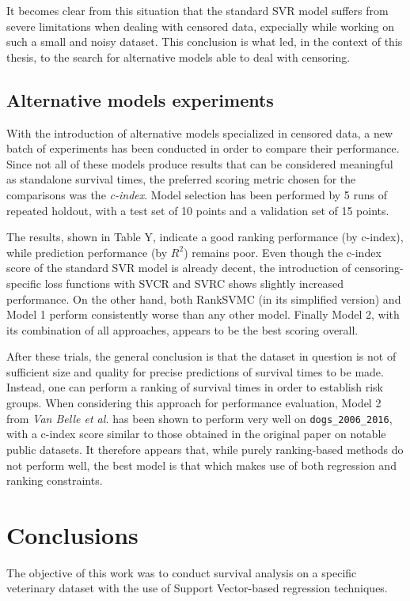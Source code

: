 \documentclass[12pt]{report}
\begin{document}
It becomes clear from this situation that the standard SVR model suffers from severe limitations when dealing with censored data, expecially while working on such a small and noisy dataset. This conclusion is what led, in the context of this thesis, to the search for alternative models able to deal with censoring.

\section{Alternative models experiments}

With the introduction of alternative models specialized in censored data, a new batch of experiments has been conducted in order to compare their performance. Since not all of these models produce results that can be considered meaningful as standalone survival times, the preferred scoring metric chosen for the comparisons was the \textit{c-index}. Model selection has been performed by 5 runs of repeated holdout, with a test set of 10 points and a validation set of 15 points.

The results, shown in Table Y, indicate a good ranking performance (by c-index), while prediction performance (by $R^2$) remains poor. Even though the c-index score of the standard SVR model is already decent, the introduction of censoring-specific loss functions with SVCR and SVRC shows slightly increased performance. On the other hand, both RankSVMC (in its simplified version) and Model 1 perform consistently worse than any other model. Finally Model 2, with its combination of all approaches, appears to be the best scoring overall.

After these trials, the general conclusion is that the dataset in question is not of sufficient size and quality for precise predictions of survival times to be made. Instead, one can perform a ranking of survival times in order to establish risk groups. When considering this approach for performance evaluation, Model 2 from \textit{Van Belle et al.} \cite{vanbelle11} has been shown to perform very well on \texttt{dogs\_2006\_2016}, with a c-index score similar to those obtained in the original paper on notable public datasets. It therefore appears that, while purely ranking-based methods do not perform well, the best model is that which makes use of both regression and ranking constraints.

\chapter*{Conclusions}
\label{concl}
The objective of this work was to conduct survival analysis on a specific veterinary dataset with the use of Support Vector-based regression techniques.
\end{document}
